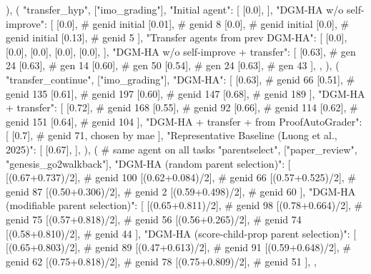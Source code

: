         ),
        (
            "transfer_hyp",
            ["imo_grading"],
            {
                "Initial agent": [
                    [0.0],
                ],
                "DGM-HA w/o self-improve": [
                    [0.0],  # genid initial
                    [0.01],  # genid 8
                    [0.0],  # genid initial
                    [0.0],  # genid initial
                    [0.13],  # genid 5
                ],
                "Transfer agents from prev DGM-HA": [
                    [0.0],
                    [0.0],
                    [0.0],
                    [0.0],
                    [0.0],
                ],
                "DGM-HA w/o self-improve + transfer": [
                    [0.63],  # gen 24
                    [0.63],  # gen 14
                    [0.60],  # gen 50
                    [0.54],  # gen 24
                    [0.63],  # gen 43
                ],
            },
        ),
        (
            "transfer_continue",
            ["imo_grading"],
            {
                "DGM-HA": [
                    [0.63],  # genid 66
                    [0.51],  # genid 135
                    [0.61],  # genid 197
                    [0.60],  # genid 147
                    [0.68],  # genid 189
                ],
                "DGM-HA + transfer": [
                    [0.72],  # genid 168
                    [0.55],  # genid 92
                    [0.66],  # genid 114
                    [0.62],  # genid 151
                    [0.64],  # genid 104
                ],
                "DGM-HA + transfer + from ProofAutoGrader": [
                    [0.7],  # genid 71, chosen by mae
                ],
                "Representative Baseline (Luong et al., 2025)": [
                    [0.67],
                ],
            }
        ),
        (
            # same agent on all tasks
            "parentselect",
            ["paper_review", "genesis_go2walkback"],
            {
                "DGM-HA (random parent selection)": [
                    [(0.67+0.737)/2],  # genid 100
                    [(0.62+0.084)/2],  # genid 66
                    [(0.57+0.525)/2],  # genid 87
                    [(0.50+0.306)/2],  # genid 2
                    [(0.59+0.498)/2],  # genid 60
                ],
                "DGM-HA (modifiable parent selection)": [
                    [(0.65+0.811)/2],  # genid 98
                    [(0.78+0.664)/2],  # genid 75
                    [(0.57+0.818)/2],  # genid 56
                    [(0.56+0.265)/2],  # genid 74
                    [(0.58+0.810)/2],  # genid 44
                ],
                "DGM-HA (score-child-prop parent selection)": [
                    [(0.65+0.803)/2],  # genid 89
                    [(0.47+0.613)/2],  # genid 91
                    [(0.59+0.648)/2],  # genid 62
                    [(0.75+0.818)/2],  # genid 78
                    [(0.75+0.809)/2],  # genid 51
                ],
            },
